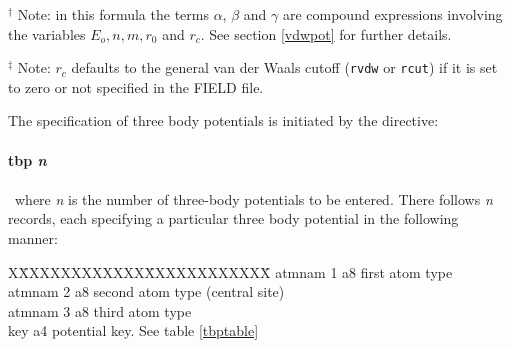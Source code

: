 \begin{table}[ht]
\begin{centering}
\end{centering}

$^{\dagger}$ Note: in this formula the terms $\alpha$, $\beta$ and
$\gamma$ are compound expressions involving the variables
$E_{o},n,m,r_{0}$ and $r_{c}$. See section \ref{vdwpot} for further details.

$^{\ddagger}$ Note: $r_{c}$ defaults to the general van der Waals
cutoff ({\tt rvdw} or {\tt rcut}) if it is set to zero or not
specified in the FIELD file.
\end{table}
The specification of three body potentials is initiated by the directive:

\paragraph*{tbp {\em n}}

\paragraph*{}

\noindent
~where {\em n} is the number of three-body potentials to be entered. There
follows {\em n} records, each specifying a particular three body potential
in the following manner:

\begin{tabbing}
X\=XXXXXXXXXXXX\=XXXXXXXXXXXX\=\kill
\> atmnam 1 \> a8 \> first atom type \\
\> atmnam 2 \> a8 \> second atom type (central site)\\
\> atmnam 3 \> a8 \> third atom type\\
\> key \> a4 \> potential key. See table \ref{tbptable}\\
\end{tabbing}

